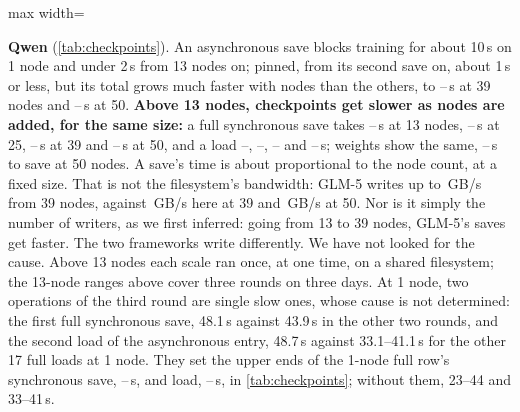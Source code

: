 \begin{table}[h]
  \caption{Checkpoint times in seconds, range over repetitions: synchronous save and its filesystem throughput, asynchronous save (time training is blocked, and total), pinned asynchronous save (blocked from the second save on, total), load.}
  \label{tab:checkpoints}
  \centering\small
  \begin{adjustbox}{max width=\linewidth}
  \end{adjustbox}
\end{table}

\textbf{Qwen} (\cref{tab:checkpoints}). An asynchronous save blocks training for about 10\,s on 1 node and under 2\,s from 13 nodes on; pinned, from its second save on, about 1\,s or less, but its total grows much faster with nodes than the others, to \TriCkQBigPinTotalLo--\TriCkQBigPinTotalHi\,s at 39 nodes and \TriCkQFiftyPinTotalLo--\TriCkQFiftyPinTotalHi\,s at 50. \textbf{Above 13 nodes, checkpoints get slower as nodes are added, for the same size:} a full synchronous save takes \TriCkQThirteenSyncLo--\TriCkQThirteenSyncHi\,s at 13 nodes, \TriCkQTopSyncLo--\TriCkQTopSyncHi\,s at 25, \TriCkQBigSyncLo--\TriCkQBigSyncHi\,s at 39 and \TriCkQFiftySyncLo--\TriCkQFiftySyncHi\,s at 50, and a load \TriCkQThirteenLoadLo--\TriCkQThirteenLoadHi, \TriCkQTopLoadLo--\TriCkQTopLoadHi, \TriCkQBigLoadLo--\TriCkQBigLoadHi{} and \TriCkQFiftyLoadLo--\TriCkQFiftyLoadHi\,s; weights show the same, \TriCkQFiftyWSaveLo--\TriCkQFiftyWSaveHi\,s to save at 50 nodes. A save's time is about proportional to the node count, at a fixed size. That is not the filesystem's bandwidth: GLM-5 writes up to \TriCkGBigFSyncGBs\,GB/s from 39 nodes, against \TriCkQBigSyncGBs\,GB/s here at 39 and \TriCkQFiftySyncGBs\,GB/s at 50. Nor is it simply the number of writers, as we first inferred: going from 13 to 39 nodes, GLM-5's saves get faster. The two frameworks write differently. We have not looked for the cause. Above 13 nodes each scale ran once, at one time, on a shared filesystem; the 13-node ranges above cover three rounds on three days. At 1 node, two operations of the third round are single slow ones, whose cause is not determined: the first full synchronous save, 48.1\,s against 43.9\,s in the other two rounds, and the second load of the asynchronous entry, 48.7\,s against 33.1--41.1\,s for the other 17 full loads at 1 node. They set the upper ends of the 1-node full row's synchronous save, \TriCkQOneSyncLo--\TriCkQOneSyncHi\,s, and load, \TriCkQOneLoadLo--\TriCkQOneLoadHi\,s, in \cref{tab:checkpoints}; without them, 23--44 and 33--41\,s.

